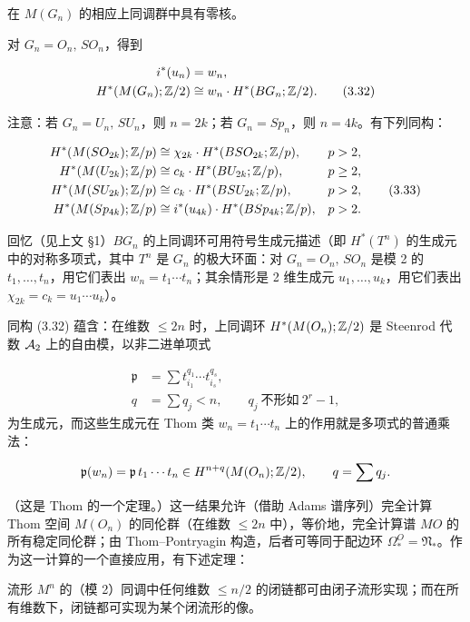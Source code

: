 在 $M(G_n)$ 的相应上同调群中具有零核。

对 $G_n=O_n,\,SO_n$，得到

\begin{align}
i^*(u_n) &= w_n, \nonumber\\
H^*(M(G_n);\mathbb{Z}/2) &\cong w_n\cdot H^*(BG_n;\mathbb{Z}/2). \tag{3.32}
\end{align}

注意：若 $G_n=U_n,\,SU_n$，则 $n=2k$；若 $G_n=Sp_n$，则 $n=4k$。有下列同构：

\begin{align}
H^*(M(SO_{2k});\mathbb{Z}/p) &\cong \chi_{2k}\cdot H^*(BSO_{2k};\mathbb{Z}/p), && p>2, \nonumber\\
H^*(M(U_{2k});\mathbb{Z}/p) &\cong c_k\cdot H^*(BU_{2k};\mathbb{Z}/p), && p\ge 2, \nonumber\\
H^*(M(SU_{2k});\mathbb{Z}/p) &\cong c_k\cdot H^*(BSU_{2k};\mathbb{Z}/p), && p>2, \tag{3.33}\\
H^*(M(Sp_{4k});\mathbb{Z}/p) &\cong i^*(u_{4k})\cdot H^*(BSp_{4k};\mathbb{Z}/p), && p>2. \nonumber
\end{align}

回忆（见上文 §1）$BG_n$ 的上同调环可用符号生成元描述（即 $H^*(T^n)$ 的生成元中的对称多项式，其中 $T^n$ 是 $G_n$ 的极大环面：对 $G_n=O_n,\,SO_n$ 是模 2 的 $t_1,\dots,t_n$，用它们表出 $w_n=t_1\cdots t_n$；其余情形是 2 维生成元 $u_1,\dots,u_k$，用它们表出 $\chi_{2k}=c_k=u_1\cdots u_k$）。

同构 (3.32) 蕴含：在维数 $\le 2n$ 时，上同调环 $H^*(M(O_n);\mathbb{Z}/2)$ 是 Steenrod 代数 $\mathcal{A}_2$ 上的自由模，以非二进单项式

\[
\begin{aligned}
\mathfrak{p}&=\sum t_{i_1}^{q_1}\cdots t_{i_s}^{q_s},\\
q&=\sum q_j<n,\qquad q_j\ \text{不形如}\ 2^r-1,
\end{aligned}
\]
为生成元，而这些生成元在 Thom 类 $w_n=t_1\cdots t_n$ 上的作用就是多项式的普通乘法：

\[ \mathfrak{p}(w_n)=\mathfrak{p}\,t_1\cdots t_n\in H^{n+q}(M(O_n);\mathbb{Z}/2),\qquad q=\sum q_j. \]

（这是 Thom 的一个定理。）这一结果允许（借助 Adams 谱序列）完全计算 Thom 空间 $M(O_n)$ 的同伦群（在维数 $\le 2n$ 中），等价地，完全计算谱 $MO$ 的所有稳定同伦群；由 Thom--Pontryagin 构造，后者可等同于配边环 $\Omega_*^{O}=\mathfrak{N}_*$。作为这一计算的一个直接应用，有下述定理：

\begin{theorem}{}
流形 $M^n$ 的（模 2）同调中任何维数 $\le n/2$ 的闭链都可由闭子流形实现；而在所有维数下，闭链都可实现为某个闭流形的像。
\end{theorem}

